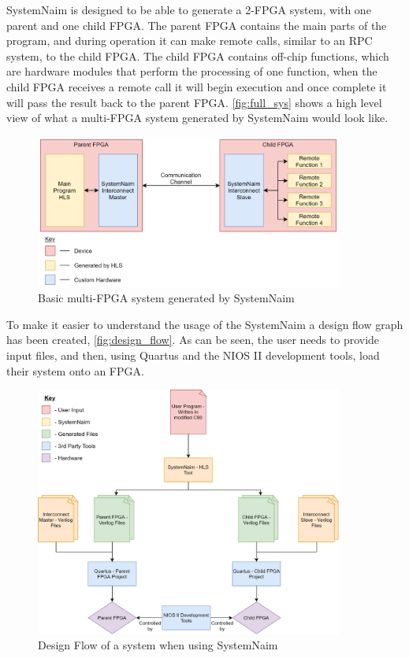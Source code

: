SystemNaim is designed to be able to generate a 2-FPGA system, with one parent and one child FPGA. The parent FPGA contains the main parts of the program, and during operation it can make remote calls, similar to an RPC system, to the child FPGA. The child FPGA contains off-chip functions, which are hardware modules that perform the processing of one function, when the child FPGA receives a remote call it will begin execution and once complete it will pass the result back to the parent FPGA. \autoref{fig:full_sys} shows a high level view of what a multi-FPGA system generated by SystemNaim would look like.

\begin{figure}[!htb]
    \centering
    \includegraphics[width=0.9\textwidth]{03_design/images/full_system.png}
    \caption{Basic multi-FPGA system generated by SystemNaim}
    \label{fig:full_sys}
\end{figure}

To make it easier to understand the usage of the SystemNaim a design flow graph has been created, \autoref{fig:design_flow}. As can be seen, the user needs to provide input files, and then, using Quartus and the NIOS II development tools, load their system onto an FPGA.

\begin{figure}
    \centering
    \includegraphics[width=0.9\textwidth]{03_design/images/design_flow.png}
    \caption{Design Flow of a system when using SystemNaim}
    \label{fig:design_flow}
\end{figure}